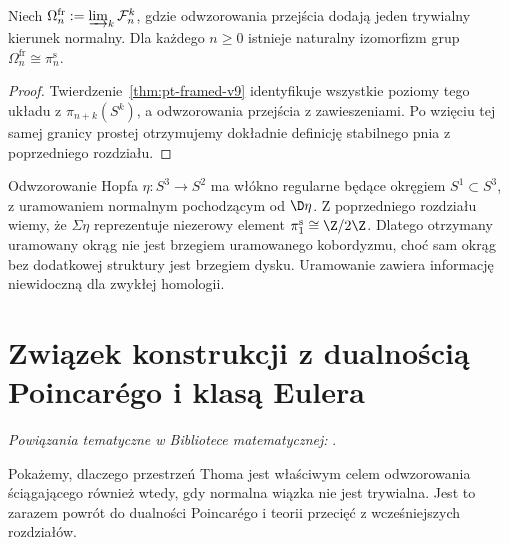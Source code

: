 \begin{wniosek}
\label{cor:pt-stable-v9}
Niech $\Omega_n^{\mathrm{fr}}:=\varinjlim_k\mathcal F_n^k$,
gdzie odwzorowania przejścia dodają jeden trywialny kierunek
normalny. Dla każdego $n\ge0$ istnieje naturalny
izomorfizm grup
$\Omega_n^{\mathrm{fr}}\cong\pi_n^{\mathrm s}$.
\end{wniosek}
\begin{proof}
Twierdzenie~\ref{thm:pt-framed-v9} identyfikuje wszystkie
poziomy tego układu z $\pi_{n+k}(S^k)$,
a odwzorowania przejścia z zawieszeniami. Po wzięciu
tej samej granicy prostej otrzymujemy dokładnie
definicję stabilnego pnia z poprzedniego rozdziału.
\end{proof}

\begin{przyklad}
Odwzorowanie Hopfa $\eta:S^3\to S^2$ ma włókno
regularne będące okręgiem $S^1\subset S^3$, z
uramowaniem normalnym pochodzącym od $\D\eta$.
Z poprzedniego rozdziału wiemy, że $\Sigma\eta$
reprezentuje niezerowy element $\pi_1^{\mathrm s}\cong\Z/2\Z$.
Dlatego otrzymany uramowany okrąg nie jest brzegiem
uramowanego kobordyzmu, choć sam okrąg bez dodatkowej
struktury jest brzegiem dysku. Uramowanie zawiera
informację niewidoczną dla zwykłej homologii.
\end{przyklad}

\section{Związek konstrukcji z dualnością Poincarégo i klasą Eulera}

\noindent\emph{Powiązania tematyczne w Bibliotece matematycznej:} .

Pokażemy, dlaczego przestrzeń Thoma jest właściwym celem
odwzorowania ściągającego również wtedy, gdy normalna
wiązka nie jest trywialna. Jest to zarazem powrót do
dualności Poincarégo i teorii przecięć z wcześniejszych rozdziałów.

